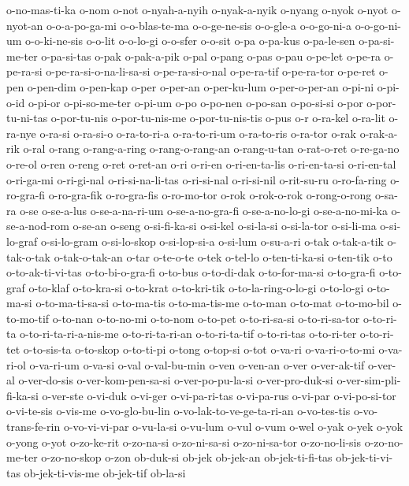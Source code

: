 {o-no-mas-ti-ka o-nom o-not o-nyah-a-nyih o-nyak-a-nyik o-nyang o-nyok
o-nyot o-nyot-an o-o-a-po-ga-mi o-o-blas-te-ma o-o-ge-ne-sis o-o-gle-a
o-o-go-ni-a o-o-go-ni-um o-o-ki-ne-sis o-o-lit o-o-lo-gi o-o-sfer o-o-sit
o-pa o-pa-kus o-pa-le-sen o-pa-si-me-ter o-pa-si-tas o-pak o-pak-a-pik
o-pal o-pang o-pas o-pau o-pe-let o-pe-ra o-pe-ra-si
o-pe-ra-si-o-na-li-sa-si o-pe-ra-si-o-nal o-pe-ra-tif o-pe-ra-tor o-pe-ret
o-pen o-pen-dim o-pen-kap o-per o-per-an o-per-ku-lum o-per-o-per-an
o-pi-ni o-pi-o-id o-pi-or o-pi-so-me-ter o-pi-um o-po o-po-nen o-po-san
o-po-si-si o-por o-por-tu-ni-tas o-por-tu-nis o-por-tu-nis-me
o-por-tu-nis-tis o-pus o-r o-ra-kel o-ra-lit o-ra-nye o-ra-si o-ra-si-o
o-ra-to-ri-a o-ra-to-ri-um o-ra-to-ris o-ra-tor o-rak o-rak-a-rik o-ral
o-rang o-rang-a-ring o-rang-o-rang-an o-rang-u-tan o-rat-o-ret o-re-ga-no
o-re-ol o-ren o-reng o-ret o-ret-an o-ri o-ri-en o-ri-en-ta-lis
o-ri-en-ta-si o-ri-en-tal o-ri-ga-mi o-ri-gi-nal o-ri-si-na-li-tas
o-ri-si-nal o-ri-si-nil o-rit-su-ru o-ro-fa-ring o-ro-gra-fi o-ro-gra-fik
o-ro-gra-fis o-ro-mo-tor o-rok o-rok-o-rok o-rong-o-rong o-sa-ra o-se
o-se-a-lus o-se-a-na-ri-um o-se-a-no-gra-fi o-se-a-no-lo-gi
o-se-a-no-mi-ka o-se-a-nod-rom o-se-an o-seng o-si-fi-ka-si o-si-kel
o-si-la-si o-si-la-tor o-si-li-ma o-si-lo-graf o-si-lo-gram o-si-lo-skop
o-si-lop-si-a o-si-lum o-su-a-ri o-tak o-tak-a-tik o-tak-o-tak
o-tak-o-tak-an o-tar o-te-o-te o-tek o-tel-lo o-ten-ti-ka-si o-ten-tik
o-to o-to-ak-ti-vi-tas o-to-bi-o-gra-fi o-to-bus o-to-di-dak
o-to-for-ma-si o-to-gra-fi o-to-graf o-to-klaf o-to-kra-si o-to-krat
o-to-kri-tik o-to-la-ring-o-lo-gi o-to-lo-gi o-to-ma-si o-to-ma-ti-sa-si
o-to-ma-tis o-to-ma-tis-me o-to-man o-to-mat o-to-mo-bil o-to-mo-tif
o-to-nan o-to-no-mi o-to-nom o-to-pet o-to-ri-sa-si o-to-ri-sa-tor
o-to-ri-ta o-to-ri-ta-ri-a-nis-me o-to-ri-ta-ri-an o-to-ri-ta-tif
o-to-ri-tas o-to-ri-ter o-to-ri-tet o-to-sis-ta o-to-skop o-to-ti-pi
o-tong o-top-si o-tot o-va-ri o-va-ri-o-to-mi o-va-ri-ol o-va-ri-um
o-va-si o-val o-val-bu-min o-ven o-ven-an o-ver o-ver-ak-tif o-ver-al
o-ver-do-sis o-ver-kom-pen-sa-si o-ver-po-pu-la-si o-ver-pro-duk-si
o-ver-sim-pli-fi-ka-si o-ver-ste o-vi-duk o-vi-ger o-vi-pa-ri-tas
o-vi-pa-rus o-vi-par o-vi-po-si-tor o-vi-te-sis o-vis-me o-vo-glo-bu-lin
o-vo-lak-to-ve-ge-ta-ri-an o-vo-tes-tis o-vo-trans-fe-rin o-vo-vi-vi-par
o-vu-la-si o-vu-lum o-vul o-vum o-wel o-yak o-yek o-yok o-yong o-yot
o-zo-ke-rit o-zo-na-si o-zo-ni-sa-si o-zo-ni-sa-tor o-zo-no-li-sis
o-zo-no-me-ter o-zo-no-skop o-zon ob-duk-si ob-jek ob-jek-an
ob-jek-ti-fi-tas ob-jek-ti-vi-tas ob-jek-ti-vis-me ob-jek-tif ob-la-si
}
